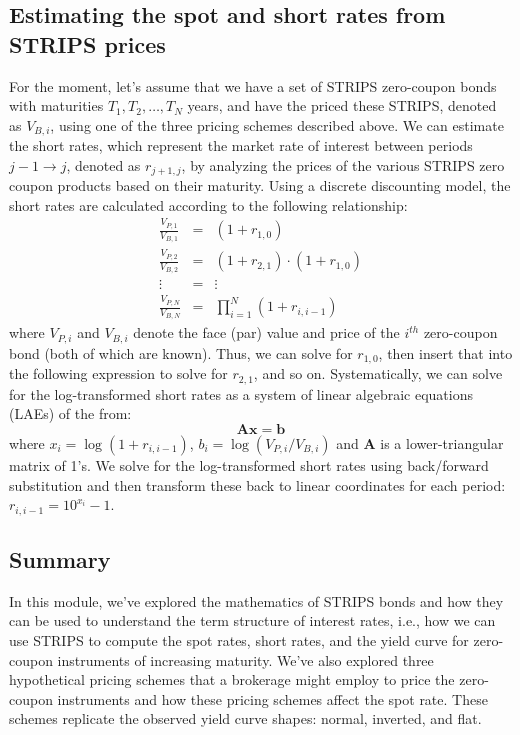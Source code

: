 \documentclass[11pt]{article}
\theoremstyle{definition}
\begin{document}
\subsection{Estimating the spot and short rates from STRIPS prices}
For the moment, let's assume that we have a set of STRIPS zero-coupon bonds with maturities $T_{1}, T_{2},\ldots, T_{N}$ years, 
and have the priced these STRIPS, denoted as $V_{B, i}$, using one of the three pricing schemes described above.
We can estimate the short rates, which represent the market rate of interest between periods $j-1\rightarrow{j}$, denoted as $r_{j+1,j}$, by analyzing the prices of the various STRIPS zero coupon products based on their maturity. Using a discrete discounting model, the short rates are calculated according to the following relationship:
\begin{eqnarray}
\frac{V_{P,1}}{V_{B,1}} & = & \left(1+r_{1,0}\right) \\
\frac{V_{P,2}}{V_{B,2}} & = & \left(1+r_{2,1}\right)\cdot\left(1+r_{1,0}\right) \\
\vdots & = & \vdots \\
\frac{V_{P,N}}{V_{B,N}} & = & \prod_{i=1}^{N}\left(1+r_{i,i-1}\right)
\end{eqnarray}
where $V_{P, i}$ and $V_{B, i}$ denote the face (par) value and price of the $i^{th}$ zero-coupon bond (both of which are known). Thus, we can solve for $r_{1,0}$, then insert that into the following expression to solve for $r_{2,1}$, and so on. Systematically, we can solve for the log-transformed short rates as a system of linear algebraic equations (LAEs) of the from:
\begin{equation}
\mathbf{A}\mathbf{x} = \mathbf{b}
\end{equation}
where $x_{i} = \log\left(1+r_{i,i-1}\right)$, $b_{i} = \log\left(V_{P,i}/V_{B,i}\right)$ and $\mathbf{A}$ is a lower-triangular matrix of 1's. We solve for the log-transformed short rates using back/forward substitution
and then transform these back to linear coordinates for each period: $r_{i,i-1} = 10^{x_{i}} - 1$.

\subsection{Summary}
In this module, we've explored the mathematics of STRIPS bonds and how they can be used to understand the term structure of interest rates, i.e., how we can use STRIPS to compute the spot rates, short rates, and the yield curve for zero-coupon instruments of increasing maturity. 
We've also explored three hypothetical pricing schemes that a brokerage might employ to price the zero-coupon instruments and how these pricing schemes affect the spot rate. These schemes replicate the observed yield curve shapes: normal, inverted, and flat. 
\end{document}
